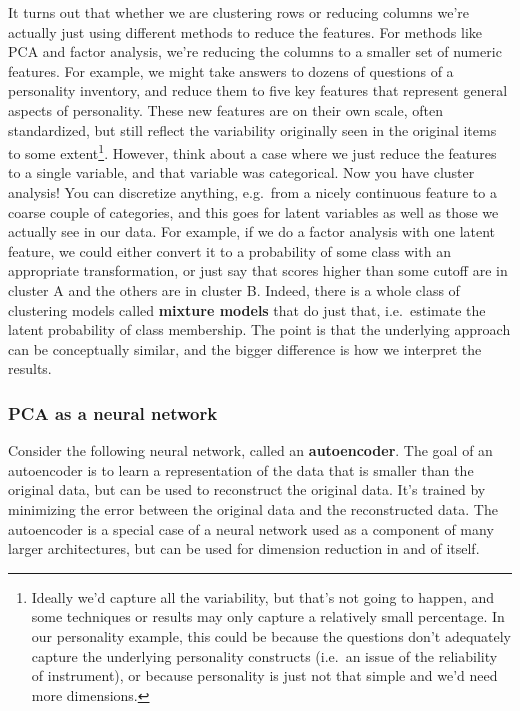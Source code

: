 \documentclass[
  letterpaper,
]{krantz}
\begin{document}
It turns out that whether we are clustering rows or reducing columns
we're actually just using different methods to reduce the features. For
methods like PCA and factor analysis, we're reducing the columns to a
smaller set of numeric features. For example, we might take answers to
dozens of questions of a personality inventory, and reduce them to five
key features that represent general aspects of personality. These new
features are on their own scale, often standardized, but still reflect
the variability originally seen in the original items to some
extent\footnote{Ideally we'd capture all the variability, but that's not
  going to happen, and some techniques or results may only capture a
  relatively small percentage. In our personality example, this could be
  because the questions don't adequately capture the underlying
  personality constructs (i.e.~an issue of the reliability of
  instrument), or because personality is just not that simple and we'd
  need more dimensions.}. However, think about a case where we just
reduce the features to a single variable, and that variable was
categorical. Now you have cluster analysis! You can discretize anything,
e.g.~from a nicely continuous feature to a coarse couple of categories,
and this goes for latent variables as well as those we actually see in
our data. For example, if we do a factor analysis with one latent
feature, we could either convert it to a probability of some class with
an appropriate transformation, or just say that scores higher than some
cutoff are in cluster A and the others are in cluster B. Indeed, there
is a whole class of clustering models called \textbf{mixture models}
that do just that, i.e.~estimate the latent probability of class
membership. The point is that the underlying approach can be
conceptually similar, and the bigger difference is how we interpret the
results.

\subsubsection{PCA as a neural network}\label{pca-as-a-neural-network}

Consider the following neural network, called an \textbf{autoencoder}.
The goal of an autoencoder is to learn a representation of the data that
is smaller than the original data, but can be used to reconstruct the
original data. It's trained by minimizing the error between the original
data and the reconstructed data. The autoencoder is a special case of a
neural network used as a component of many larger architectures, but can
be used for dimension reduction in and of itself.
\end{document}
